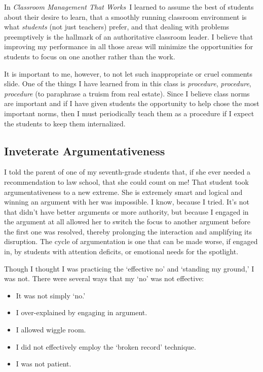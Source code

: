 \documentclass[11pt,twocolumn]{article}%
\def\cmtw{{\em Classroom Management That Works}}
\begin{document}
In \cmtw\ I learned to assume the best of students about their
desire to learn, that a smoothly running classroom environment is
what {\em students} (not just teachers) prefer, and that dealing
with problems preemptively is the hallmark of an authoritative
classroom leader. I believe that improving my performance in all
those areas will minimize the opportunities for students to focus on
one another rather than the work.

It is important to me, however, to not let such inappropriate or
cruel comments slide. One of the things I have learned from in this
class is {\em procedure}, {\em procedure}, {\em procedure} (to
paraphrase a truism from real estate). Since I believe class norms
are important and if I have given students the opportunity to help
chose the most important norms, then I must periodically teach them
as a procedure if I expect the students to keep them internalized.

\subsection{Inveterate Argumentativeness}
\label{Inveterate Argumentativeness}

I told the parent of one of my seventh-grade students that, if she
ever needed a recommendation to law school, that she could count on
me! That student took argumentativeness to a new extreme. She is
extremely smart and logical and winning an argument with her was
impossible. I know, because I tried. It's not that didn't have
better arguments or more authority, but because I engaged in the
argument at all allowed her to switch the focus to another argument
before the first one was resolved, thereby prolonging the
interaction and amplifying its disruption. The cycle of
argumentation is one that can be made worse, if engaged in, by
students with attention deficits, or emotional needs for the
spotlight.

Though I thought I was practicing the `effective no' and `standing
my ground,' I was not. There were several ways that my `no' was not
effective:

\begin{itemize}\item It was not simply `no.' \item I over-explained
by engaging in argument. \item I allowed wiggle room. \item I did
not effectively employ the `broken record' technique. \item I was
not patient.
\end{itemize}
\end{document}
